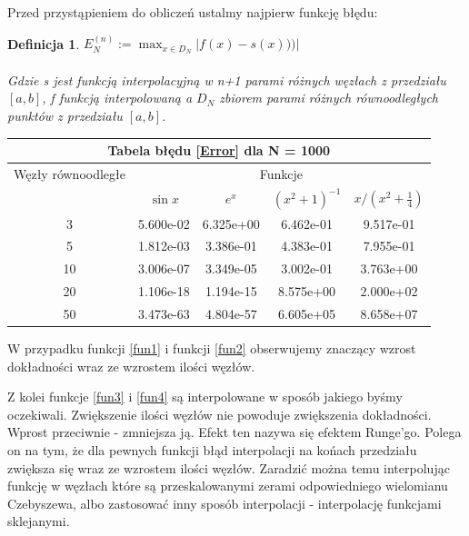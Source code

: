 \documentclass{article}
\newtheorem{defi}{Definicja}
\begin{document}
Przed przystąpieniem do obliczeń ustalmy najpierw funkcję błędu:
\begin{defi}\label{Error}
	$E_N^{(n)} := \max_{x \in D_N}|f(x)-s(x)))|$ \\
	\\
	Gdzie s jest funkcją interpolacyjną w n+1 parami różnych węzłach z przedziału $[a,b]$, f funkcją interpolowaną a $D_N$ zbiorem parami różnych równoodległych punktów z przedziału $[a,b]$.
\end{defi}

\renewcommand{\arraystretch}{1.5}  
\begin{center}
	\begin{tabular}{||c||c|c|c|c||} \hline
		\multicolumn{5}{||c||}{Tabela błędu \eqref{Error} dla N = 1000} \\ \hline
		Węzły równoodległe 	& \multicolumn{4}{|c||}{Funkcje} \\ \cline{2-5}
				& $\sin x$ & $e^x$ & $(x^{2}+1)^{-1}$ & $x/(x^{2} + \frac{1}{4})$ \\ \hline					
		3 		& 5.600e-02 &  6.325e+00 &  6.462e-01 & 9.517e-01 \\ \hline
		5 		& 1.812e-03 &  3.386e-01 &  4.383e-01 & 7.955e-01 \\ \hline
		10  	& 3.006e-07 &  3.349e-05 &  3.002e-01 & 3.763e+00 \\ \hline
		20  	& 1.106e-18 &  1.194e-15 &  8.575e+00 & 2.000e+02 \\ \hline
		50  	& 3.473e-63 &  4.804e-57 &  6.605e+05 & 8.658e+07 \\ \hline
	\end{tabular}
\end{center}
\renewcommand{\arraystretch}{1}

W przypadku funkcji \eqref{fun1} i funkcji \eqref{fun2} obserwujemy znaczący wzrost dokładności wraz ze wzrostem ilości węzłów. 

Z kolei funkcje \eqref{fun3} i \eqref{fun4} są interpolowane w sposób jakiego byśmy oczekiwali. Zwiększenie ilości węzłów nie powoduje zwiększenia dokładności. Wprost przeciwnie - zmniejsza ją. Efekt ten nazywa się efektem Runge'go. Polega on na tym, że dla pewnych funkcji błąd interpolacji na końach przedziału zwiększa się wraz ze wzrostem ilości węzłów.
Zaradzić można temu interpolując funkcję w węzłach które są przeskalowanymi zerami odpowiedniego wielomianu Czebyszewa, albo zastosować inny sposób interpolacji - interpolację funkcjami sklejanymi.
\end{document}
